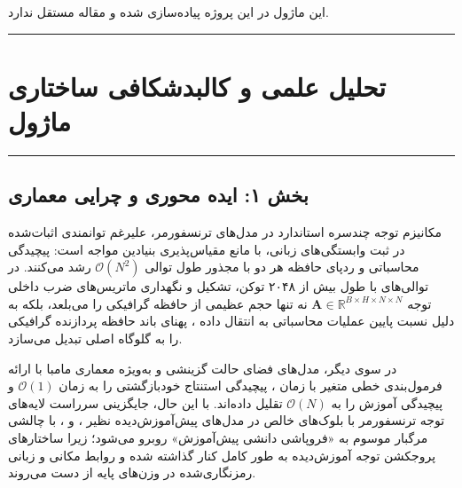 \clearpage
{}
\vspace*{0.2cm}

این ماژول در این پروژه پیاده‌سازی شده و مقاله مستقل ندارد.
\noindent\rule{\textwidth}{1.2pt}
\vspace*{0.1cm}
\section{تحلیل علمی و کالبدشکافی ساختاری ماژول }
\label{sec:mod_svd_mamba}
\vspace*{-0.2cm}
\noindent\rule{\textwidth}{0.5pt}
\vspace*{0.3cm}

\subsection*{بخش ۱: ایده محوری و چرایی معماری }
مکانیزم توجه چندسره استاندارد  در مدل‌های ترنسفورمر، علیرغم توانمندی اثبات‌شده در ثبت وابستگی‌های زبانی، با مانع مقیاس‌پذیری بنیادین مواجه است: پیچیدگی محاسباتی و ردپای حافظه هر دو با مجذور طول توالی $\mathcal{O}(N^2)$ رشد می‌کنند. در توالی‌های با طول بیش از ۲۰۴۸ توکن، تشکیل و نگهداری ماتریس‌های ضرب داخلی توجه $\mathbf{A} \in \mathbb{R}^{B \times H \times N \times N}$ نه تنها حجم عظیمی از حافظه گرافیکی  را می‌بلعد، بلکه به دلیل نسبت پایین عملیات محاسباتی به انتقال داده ، پهنای باند حافظه پردازنده گرافیکی را به گلوگاه اصلی تبدیل می‌سازد.

در سوی دیگر، مدل‌های فضای حالت گزینشی  و به‌ویژه معماری مامبا  با ارائه فرمول‌بندی خطی متغیر با زمان ، پیچیدگی استنتاج خودبازگشتی را به زمان $\mathcal{O}(1)$ و پیچیدگی آموزش را به $\mathcal{O}(N)$ تقلیل داده‌اند. با این حال، جایگزینی سرراست لایه‌های توجه ترنسفورمر با بلوک‌های خالص  در مدل‌های پیش‌آموزش‌دیده  نظیر ،  و ، با چالشی مرگبار موسوم به «فروپاشی دانشی پیش‌آموزش» روبرو می‌شود؛ زیرا ساختارهای پروجکشن توجه آموزش‌دیده به طور کامل کنار گذاشته شده و روابط مکانی و زبانی رمزنگاری‌شده در وزن‌های پایه از دست می‌روند.

